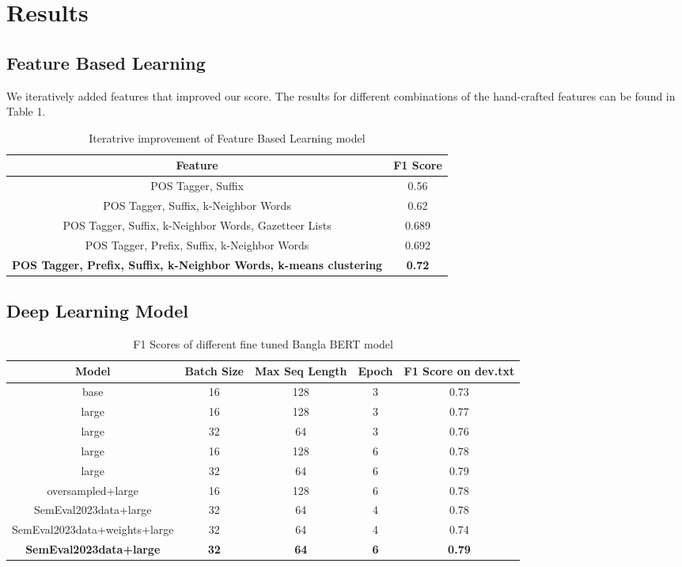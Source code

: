 \documentclass{article}
\begin{document}
\section{Results}

\subsection{Feature Based Learning}

We iteratively added features that improved our score. The results for different combinations of the hand-crafted features can be found in Table 1.

\begin{table*}[t]
\centering
\begin{tabular}{|c|c|}
\hline
\textbf{Feature}                                                 & \textbf{F1 Score} \\ \hline
POS Tagger, Suffix                                               & 0.56              \\ \hline
POS Tagger, Suffix, k-Neighbor Words                             & 0.62              \\ \hline
POS Tagger, Suffix, k-Neighbor Words, Gazetteer Lists            & 0.689             \\ \hline
POS Tagger, Prefix, Suffix, k-Neighbor Words                     & 0.692             \\ \hline
\textbf{POS Tagger, Prefix, Suffix, k-Neighbor Words, k-means clustering} & \textbf{0.72}            \\ \hline
\end{tabular}
\caption{Iteratrive improvement of Feature Based Learning model}
\end{table*}

\subsection{Deep Learning Model}

\begin{table*}[t]
\centering
\begin{tabular}{|c|c|c|c|c|}
\hline
\textbf{Model} & \textbf{Batch Size} & \textbf{Max Seq Length} & \textbf{Epoch} & \textbf{F1 Score on dev.txt} \\ \hline
base & 16 & 128 & 3 & 0.73 \\ \hline
large & 16 & 128 & 3 & 0.77 \\ \hline
large & 32 & 64 & 3 & 0.76 \\ \hline
large & 16 & 128 & 6 & 0.78 \\ \hline
large & 32 & 64 & 6 & 0.79 \\ \hline
oversampled+large & 16 & 128 & 6 & 0.78 \\ \hline
SemEval2023data+large & 32 & 64 & 4 & 0.78 \\ \hline
SemEval2023data+weights+large & 32 & 64 & 4 & 0.74 \\ \hline
\textbf{SemEval2023data+large} & \textbf{32} & \textbf{64} & \textbf{6} & \textbf{0.79} \\ \hline
\end{tabular}
\caption{F1 Scores of different fine tuned Bangla BERT model}
\label{tab:F1_DL}
\end{table*}
\end{document}
